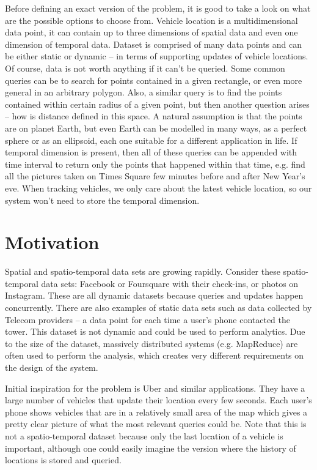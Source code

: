 \documentclass[times, utf8, diplomski]{fer}
\begin{document}
Before defining an exact version of the problem, it is good to take a look on what are the possible options to choose from. Vehicle location is a multidimensional data point, it can contain up to three dimensions of spatial data and even one dimension of temporal data. Dataset is comprised of many data points and can be either static or dynamic -- in terms of supporting updates of vehicle locations. Of course, data is not worth anything if it can't be queried. Some common queries can be to search for points contained in a given rectangle, or even more general in an arbitrary polygon. Also, a similar query is to find the points contained within certain radius of a given point, but then another question arises -- how is distance defined in this space. A natural assumption is that the points are on planet Earth, but even Earth can be modelled in many ways, as a perfect sphere or as an ellipsoid, each one suitable for a different application in life. If temporal dimension is present, then all of these queries can be appended with time interval to return only the points that happened within that time, e.g. find all the pictures taken on Times Square few minutes before and after New Year's eve. When tracking vehicles, we only care about the latest vehicle location, so our system won't need to store the temporal dimension.


\section{Motivation}
Spatial and spatio-temporal data sets are growing rapidly. Consider these spatio-temporal data sets: Facebook or Foursquare with their check-ins, or photos on Instagram. These are all dynamic datasets because queries and updates happen concurrently. There are also examples of static data sets such as data collected by Telecom providers -- a data point for each time a user's phone contacted the tower. This dataset is not dynamic and could be used to perform analytics. Due to the size of the dataset, massively distributed systems (e.g. MapReduce) are often used to perform the analysis, which creates very different requirements on the design of the system.

Initial inspiration for the problem is Uber and similar applications. They have a large number of vehicles that update their location every few seconds. Each user's phone shows vehicles that are in a relatively small area of the map which gives a pretty clear picture of what the most relevant queries could be. Note that this is not a spatio-temporal dataset because only the last location of a vehicle is important, although one could easily imagine the version where the history of locations is stored and queried.
\end{document}

